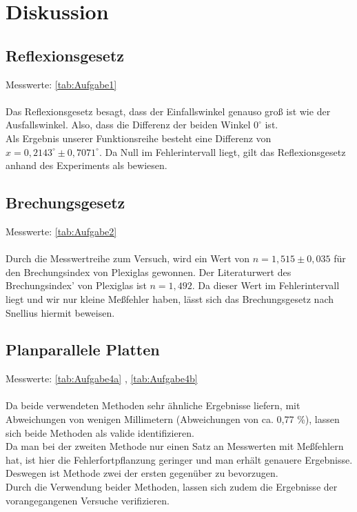 \section{Diskussion}
\label{sec:Diskussion}

\subsection{Reflexionsgesetz}

Messwerte: \autoref{tab:Aufgabe1}\\ \\

Das Reflexionsgesetz besagt, dass der Einfallswinkel genauso groß ist wie der Ausfallswinkel. Also, dass die Differenz der
beiden Winkel $0^{\circ}$ ist.\\
Als Ergebnis unserer Funktionsreihe besteht eine Differenz von $x = 0,2143^{\circ} \pm 0,7071^{\circ}$. Da Null im Fehlerintervall
liegt, gilt das Reflexionsgesetz anhand des Experiments als bewiesen.

\subsection{Brechungsgesetz}

Messwerte: \autoref{tab:Aufgabe2}\\ \\

Durch die Messwertreihe zum Versuch, wird ein Wert von $n = 1,515 \pm 0,035$ für den Brechungsindex von Plexiglas gewonnen. Der
Literaturwert des Brechungsindex' von Plexiglas ist $n = 1,492$. Da dieser Wert im Fehlerintervall liegt und wir nur kleine Meßfehler haben,
lässt sich das Brechungsgesetz nach Snellius hiermit beweisen.

\subsection{Planparallele Platten}

Messwerte: \autoref{tab:Aufgabe4a} , \autoref{tab:Aufgabe4b}\\ \\

Da beide verwendeten Methoden sehr ähnliche Ergebnisse liefern, mit Abweichungen von wenigen Millimetern (Abweichungen von ca. 0,77 \%), lassen sich beide Methoden als
valide identifizieren.\\
Da man bei der zweiten Methode nur einen Satz an Messwerten mit Meßfehlern hat, ist hier die Fehlerfortpflanzung geringer und man erhält genauere
Ergebnisse. Deswegen ist Methode zwei der ersten gegenüber zu bevorzugen.\\
Durch die Verwendung beider Methoden, lassen sich zudem die Ergebnisse der vorangegangenen Versuche verifizieren.

